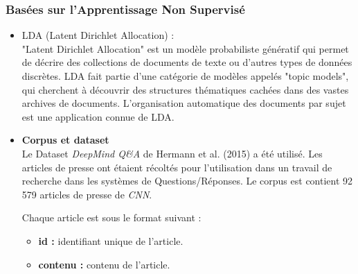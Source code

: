     \subsubsection{Basées sur l'Apprentissage Non Supervisé}
        \begin{itemize}
            \item{LDA (Latent Dirichlet Allocation) : }\\
            "Latent Dirichlet Allocation" est un modèle probabiliste génératif qui permet de décrire des collections de documents de texte ou d'autres types de données discrètes. LDA fait partie d'une catégorie de modèles appelés "topic models", qui cherchent à découvrir des structures thématiques cachées dans des vastes archives de documents. L'organisation automatique des documents par sujet est une application connue de LDA.
        \end{itemize}
        
    \begin{itemize}[label={}, leftmargin=*]
        \item{\textbf{Corpus et dataset}}\\
        Le Dataset \emph{DeepMind Q\&A} de Hermann et al. (2015) \cite{cnndailymail} a été utilisé. Les articles de presse ont étaient récoltés pour l'utilisation dans un travail de recherche dans les systèmes de Questions/Réponses. Le corpus est contient 92 579 articles de presse de \emph{CNN}.

        Chaque article est sous le format suivant :
       \begin{itemize}
        \item \textbf{id : }identifiant unique de l'article.
        \item \textbf{contenu : }contenu de l'article.
       \end{itemize}
    \end{itemize}
        
